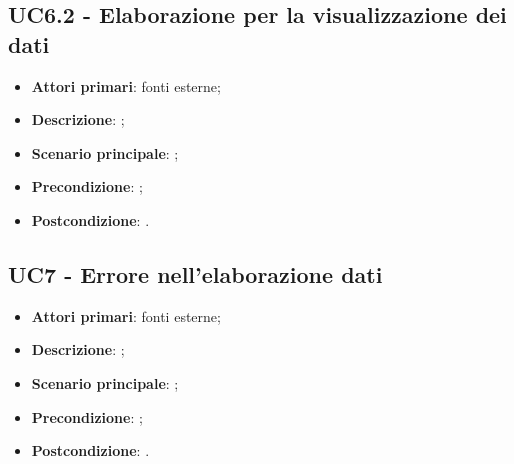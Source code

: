 \subsection{UC6.2 - Elaborazione per la visualizzazione dei dati}
\begin{itemize}
	\item \textbf{Attori primari}: fonti esterne;
	\item \textbf{Descrizione}: ;
	\item \textbf{Scenario principale}: ;
	\item \textbf{Precondizione}: ;
	\item \textbf{Postcondizione}: .
\end{itemize}

\subsection{UC7 - Errore nell'elaborazione dati}
\begin{itemize}
	\item \textbf{Attori primari}: fonti esterne;
	\item \textbf{Descrizione}: ;
	\item \textbf{Scenario principale}: ;
	\item \textbf{Precondizione}: ;
	\item \textbf{Postcondizione}: .
\end{itemize}


